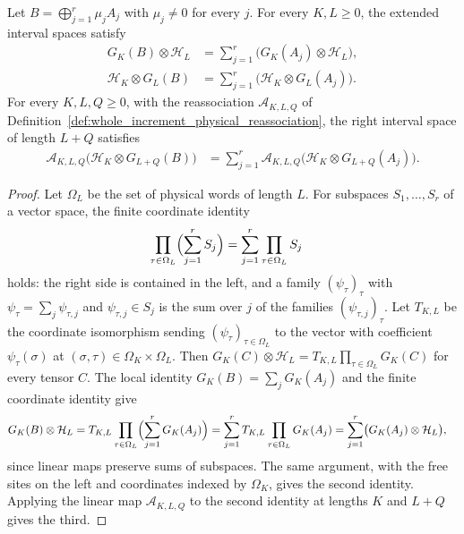 \begin{lemma}
    \label{thm:ph_block_sum_interval_spaces}
    \leanok
    Let $B=\bigoplus_{j=1}^r\mu_jA_j$ with $\mu_j\ne0$ for every $j$.
    For every $K,L\geq0$, the extended interval spaces satisfy
    \begin{align}
        G_K(B)\otimes\mathcal H_L
         & =\sum_{j=1}^r\bigl(G_K(A_j)\otimes\mathcal H_L\bigr),  \\
        \mathcal H_K\otimes G_L(B)
         & =\sum_{j=1}^r\bigl(\mathcal H_K\otimes G_L(A_j)\bigr).
    \end{align}
    For every $K,L,Q\geq0$, with the reassociation $\mathscr A_{K,L,Q}$ of
    Definition~\ref{def:whole_increment_physical_reassociation}, the
    right interval space of length $L+Q$ satisfies
    \begin{align}
        \mathscr A_{K,L,Q}\bigl(\mathcal H_K\otimes G_{L+Q}(B)\bigr)
         & =\sum_{j=1}^r
        \mathscr A_{K,L,Q}\bigl(\mathcal H_K\otimes G_{L+Q}(A_j)\bigr).
    \end{align}
\end{lemma}
\begin{proof}
    \leanok
    Let $\Omega_L$ be the set of physical words of length $L$. For subspaces
    $S_1,\dots,S_r$ of a vector space, the finite coordinate identity
    \begin{align}
        \prod_{\tau\in\Omega_L}\Bigl(\sum_{j=1}^rS_j\Bigr)
         & =\sum_{j=1}^r\prod_{\tau\in\Omega_L}S_j
    \end{align}
    holds: the right side is contained in the left, and a family
    $(\psi_\tau)_\tau$ with $\psi_\tau=\sum_j\psi_{\tau,j}$ and
    $\psi_{\tau,j}\in S_j$ is the sum over $j$ of the families
    $(\psi_{\tau,j})_\tau$.
    Let $T_{K,L}$ be the coordinate isomorphism sending
    $(\psi_\tau)_{\tau\in\Omega_L}$ to the vector with coefficient
    $\psi_\tau(\sigma)$ at $(\sigma,\tau)\in\Omega_K\times\Omega_L$. Then
    $G_K(C)\otimes\mathcal H_L=T_{K,L}\prod_{\tau\in\Omega_L}G_K(C)$ for every
    tensor $C$. The local identity $G_K(B)=\sum_jG_K(A_j)$ and the finite
    coordinate identity give
    \begin{align}
        G_K(B)\otimes\mathcal H_L
         & =T_{K,L}\prod_{\tau\in\Omega_L}\Bigl(\sum_{j=1}^rG_K(A_j)\Bigr)
        =\sum_{j=1}^rT_{K,L}\prod_{\tau\in\Omega_L}G_K(A_j)
        =\sum_{j=1}^r\bigl(G_K(A_j)\otimes\mathcal H_L\bigr),
    \end{align}
    since linear maps preserve sums of subspaces. The same argument, with
    the free sites on the left and coordinates indexed by $\Omega_K$, gives
    the second identity. Applying the linear map $\mathscr A_{K,L,Q}$ to the
    second identity at lengths $K$ and $L+Q$ gives the third.
\end{proof}

